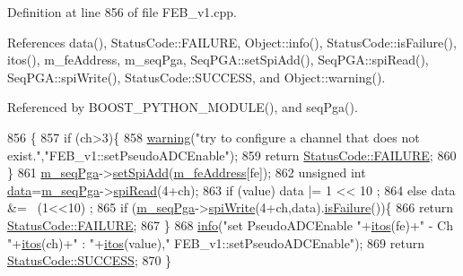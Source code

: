 Definition at line 856 of file F\+E\+B\+\_\+v1.\+cpp.



References data(), Status\+Code\+::\+F\+A\+I\+L\+U\+RE, Object\+::info(), Status\+Code\+::is\+Failure(), itos(), m\+\_\+fe\+Address, m\+\_\+seq\+Pga, Seq\+P\+G\+A\+::set\+Spi\+Add(), Seq\+P\+G\+A\+::spi\+Read(), Seq\+P\+G\+A\+::spi\+Write(), Status\+Code\+::\+S\+U\+C\+C\+E\+SS, and Object\+::warning().



Referenced by B\+O\+O\+S\+T\+\_\+\+P\+Y\+T\+H\+O\+N\+\_\+\+M\+O\+D\+U\+L\+E(), and seq\+Pga().


\begin{DoxyCode}
856                                                                  \{
857   \textcolor{keywordflow}{if} (ch>3)\{
858     \hyperlink{classObject_a65cd4fda577711660821fd2cd5a3b4c9}{warning}(\textcolor{stringliteral}{"try to configure a channel that does not exist."},\textcolor{stringliteral}{"FEB\_v1::setPseudoADCEnable"});
859     \textcolor{keywordflow}{return} \hyperlink{classStatusCode_a6f565cbeadc76d14c72f047e5e85eb4ba3da73d4c469762eb9d3c960368252b26}{StatusCode::FAILURE};
860   \}
861   \hyperlink{classFEB__v1_a6c7804ac86796f233a8393043adf2e77}{m\_seqPga}->\hyperlink{classSeqPGA_ac998ce3a6d9b5f2e88cc8393f8c1df53}{setSpiAdd}(\hyperlink{classFEB__v1_a4e1945c2d5b434125f375e9d0fc6d99f}{m\_feAddress}[fe]);
862   \textcolor{keywordtype}{unsigned} \textcolor{keywordtype}{int} \hyperlink{classFEB__v1_a6bca4320bd3bbbc32efc81097f33421a}{data}=\hyperlink{classFEB__v1_a6c7804ac86796f233a8393043adf2e77}{m\_seqPga}->\hyperlink{classSeqPGA_ab3d0e5e5d4014bc7a92588a76b8713d4}{spiRead}(4+ch);
863   \textcolor{keywordflow}{if} (value)  data |= 1 << 10 ;
864   \textcolor{keywordflow}{else}        data &= ~(1<<10) ;
865   \textcolor{keywordflow}{if} (\hyperlink{classFEB__v1_a6c7804ac86796f233a8393043adf2e77}{m\_seqPga}->\hyperlink{classSeqPGA_ad4421841ce4ce8b88ad13f63216f0743}{spiWrite}(4+ch,data).\hyperlink{classStatusCode_a5dd22dc6eb2c52fc4cabc58f6dea2eb7}{isFailure}())\{
866     \textcolor{keywordflow}{return} \hyperlink{classStatusCode_a6f565cbeadc76d14c72f047e5e85eb4ba3da73d4c469762eb9d3c960368252b26}{StatusCode::FAILURE};
867   \}
868   \hyperlink{classObject_a644fd329ea4cb85f54fa6846484b84a8}{info}(\textcolor{stringliteral}{"set PseudoADCEnable "}+\hyperlink{Tools_8h_af330027dbdafb9a30768b3613c553e60}{itos}(fe)+\textcolor{stringliteral}{" - Ch "}+\hyperlink{Tools_8h_af330027dbdafb9a30768b3613c553e60}{itos}(ch)+\textcolor{stringliteral}{" : "}+\hyperlink{Tools_8h_af330027dbdafb9a30768b3613c553e60}{itos}(value),\textcolor{stringliteral}{"
      FEB\_v1::setPseudoADCEnable"});
869   \textcolor{keywordflow}{return} \hyperlink{classStatusCode_a6f565cbeadc76d14c72f047e5e85eb4badd0da38d3ba0d922efd1f4619bc37ad8}{StatusCode::SUCCESS};
870 \}
\end{DoxyCode}
\mbox{\label{classFEB__v1_af422c3cf889440d5d49cce51d98b496e}} 
